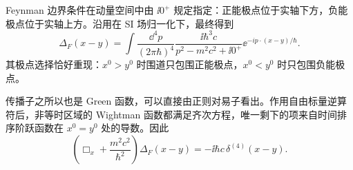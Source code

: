 Feynman 边界条件在动量空间中由 $\ii0^+$ 规定指定：正能极点位于实轴下方，负能极点位于实轴上方。沿用在 SI 场归一化下，最终得到
\begin{equation}
\boxed{
\Delta_F(x-y)
=\int\frac{\dd^4 p}{(2\pi\hbar)^4}
\frac{\ii\hbar^3c}{p^2-m^2c^2+\ii0^+}
 \ee^{-ip\cdot(x-y)/\hbar}.}
\label{eq:scalar-Fourier-r2}
\end{equation}
其极点选择恰好重现：$x^0>y^0$ 时围道只包围正能极点，$x^0<y^0$ 时只包围负能极点。

传播子之所以也是 Green 函数，可以直接由正则对易子看出。作用自由标量逆算符后，非等时区域的 Wightman 函数都满足齐次方程，唯一剩下的项来自时间排序阶跃函数在 $x^0=y^0$ 处的导数。因此
\begin{equation}
\boxed{
\left(\Box_x+\frac{m^2c^2}{\hbar^2}\right)\Delta_F(x-y)
=-\ii\hbar c\,\delta^{(4)}(x-y).}
\label{eq:scalar-green-exact-r2}
\end{equation}

